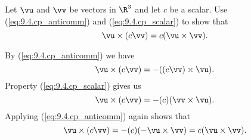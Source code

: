 \begin{activity} \label{A:9.4.3}  Let $\vu$ and $\vv$ be vectors in $\R^3$ and let $c$ be a scalar. Use (\ref{eq:9.4.cp_anticomm}) and (\ref{eq:9.4.cp_scalar}) to show that
\[\vu \times (c\vv) = c(\vu \times \vv).\]
\end{activity}
\begin{smallhint}

\end{smallhint}
\begin{bighint}

\end{bighint}
\begin{activitySolution}
By (\ref{eq:9.4.cp_anticomm}) we have 
\[\vu \times (c\vv) = -((c\vv) \times \vu).\]
Property (\ref{eq:9.4.cp_scalar}) gives us 
\[\vu \times (c\vv) = -(c)(\vv \times \vu).\]
Applying (\ref{eq:9.4.cp_anticomm}) again shows that
\[\vu \times (c\vv) = -(c)(-\vu \times \vv) = c(\vu \times \vv).\]
\end{activitySolution}
\aftera
